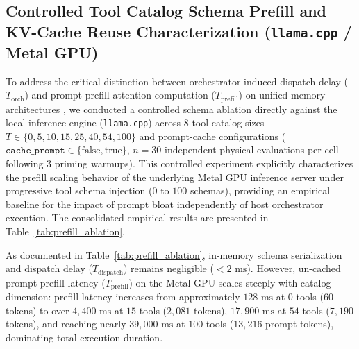 \documentclass[preprint,12pt,3p]{elsarticle}
\begin{document}
\subsection{Controlled Tool Catalog Schema Prefill and KV-Cache Reuse Characterization (\texttt{llama.cpp} / Metal GPU)}
To address the critical distinction between orchestrator-induced dispatch delay ($T_{\text{orch}}$) and prompt-prefill attention computation ($T_{\text{prefill}}$) on unified memory architectures \cite{kwon2023vllm, williams2009roofline}, we conducted a controlled schema ablation directly against the local inference engine (\texttt{llama.cpp}) across 8 tool catalog sizes $T \in \{0, 5, 10, 15, 25, 40, 54, 100\}$ and prompt-cache configurations ($\texttt{cache\_prompt} \in \{\text{false}, \text{true}\}$, $n=30$ independent physical evaluations per cell following 3 priming warmups). This controlled experiment explicitly characterizes the prefill scaling behavior of the underlying Metal GPU inference server under progressive tool schema injection ($0$ to $100$ schemas), providing an empirical baseline for the impact of prompt bloat independently of host orchestrator execution. The consolidated empirical results are presented in Table~\ref{tab:prefill_ablation}.



As documented in Table~\ref{tab:prefill_ablation}, in-memory schema serialization and dispatch delay ($T_{\text{dispatch}}$) remains negligible ($< 2\text{ ms}$). However, un-cached prompt prefill latency ($T_{\text{prefill}}$) on the Metal GPU scales steeply with catalog dimension: prefill latency increases from approximately $128\text{ ms}$ at $0$ tools ($60$ tokens) to over $4{,}400\text{ ms}$ at $15$ tools ($2{,}081$ tokens), $17{,}900\text{ ms}$ at $54$ tools ($7{,}190$ tokens), and reaching nearly $39{,}000\text{ ms}$ at $100$ tools ($13{,}216$ prompt tokens), dominating total execution duration.
\end{document}

